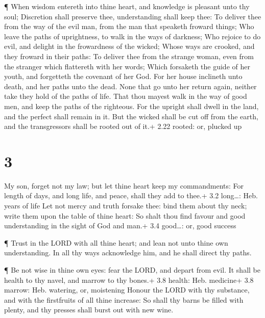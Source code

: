 ¶ When wisdom entereth into thine heart, and knowledge is
pleasant unto thy soul;  Discretion shall preserve thee,
understanding shall keep thee:  To deliver thee from the
way of the evil man, from the man that speaketh froward things;
 Who leave the paths of uprightness, to walk in the ways of
darkness;  Who rejoice to do evil, and delight in the
frowardness of the wicked;  Whose ways are crooked, and
they froward in their paths:  To deliver thee from the
strange woman, even from the stranger which flattereth with her words;
 Which forsaketh the guide of her youth, and forgetteth the
covenant of her God.  For her house inclineth unto death,
and her paths unto the dead.  None that go unto her return
again, neither take they hold of the paths of life.  That
thou mayest walk in the way of good men, and keep the paths of the
righteous.  For the upright shall dwell in the land, and
the perfect shall remain in it.  But the wicked shall be
cut off from the earth, and the transgressors shall be rooted out of
it.+ 2.22 rooted: or, plucked up

\hypertarget{section-2}{%
\section{3}\label{section-2}}

 My son, forget not my law; but let thine heart keep my
commandments:  For length of days, and long life, and peace,
shall they add to thee.+ 3.2 long\ldots: Heb. years of life 
Let not mercy and truth forsake thee: bind them about thy neck; write
them upon the table of thine heart:  So shalt thou find
favour and good understanding in the sight of God and man.+ 3.4
good\ldots: or, good success

 ¶ Trust in the LORD with all thine heart; and lean not unto
thine own understanding.  In all thy ways acknowledge him,
and he shall direct thy paths.

 ¶ Be not wise in thine own eyes: fear the LORD, and depart
from evil.  It shall be health to thy navel, and marrow to
thy bones.+ 3.8 health: Heb. medicine+ 3.8 marrow: Heb. watering, or,
moistening  Honour the LORD with thy substance, and with the
firstfruits of all thine increase:  So shall thy barns be
filled with plenty, and thy presses shall burst out with new wine.

